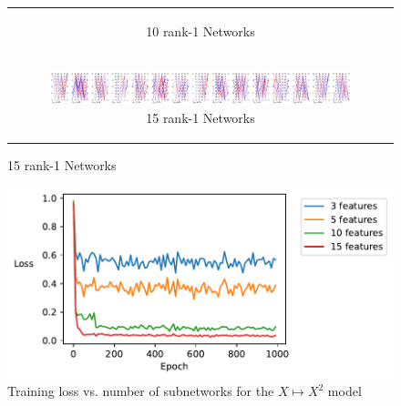 \documentclass{article}
\theoremstyle{plain}
\theoremstyle{definition}
\theoremstyle{remark}
\begin{document}
\begin{figure}[ht]
\begin{minipage}{\textwidth}
\begin{tabular}{c}
\begin{subfigure}{0.3\textwidth}
                \caption{10 rank-1 Networks}
            \end{subfigure} \\ %
            \begin{subfigure}{0.3\textwidth}
                \centering
                \includegraphics[width=\linewidth]{../figures/s10_squared_decompositions_feature15.pdf}
                \caption{15 rank-1 Networks}
            \end{subfigure} 
        \end{tabular}
    \end{minipage}

\end{figure}

\begin{figure}[ht]
    \centerline{\includegraphics[width=\textwidth]{../figures/s11_squared_features_vs_loss.pdf}}
    \centering
    \caption{Training loss vs. number of subnetworks for the $X \mapsto X^2$ model}\label{fig:s11_squared_features_vs_loss}
\end{figure}
\end{document}
